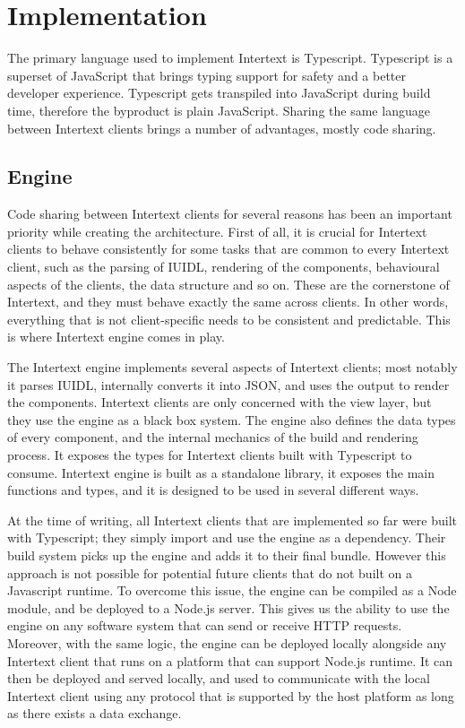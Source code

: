 
\chapter{Implementation} \label{implementation}

The primary language used to implement Intertext is Typescript. Typescript is a superset of JavaScript that brings typing support for safety and a better developer experience. Typescript gets transpiled into JavaScript during build time, therefore the byproduct is plain JavaScript. Sharing the same language between Intertext clients brings a number of advantages, mostly code sharing.

\section{Engine}

Code sharing between Intertext clients for several reasons has been an important priority while creating the architecture. First of all, it is crucial for Intertext clients to behave consistently for some tasks that are common to every Intertext client, such as the parsing of IUIDL, rendering of the components, behavioural aspects of the clients, the data structure and so on. These are the cornerstone of Intertext, and they must behave exactly the same across clients. In other words, everything that is not client-specific needs to be consistent and predictable. This is where Intertext engine comes in play.

The Intertext engine implements several aspects of Intertext clients; most notably it parses IUIDL, internally converts it into JSON, and uses the output to render the components. Intertext clients are only concerned with the view layer, but they use the engine as a black box system. The engine also defines the data types of every component, and the internal mechanics of the build and rendering process. It exposes the types for Intertext clients built with Typescript to consume. Intertext engine is built as a standalone library, it exposes the main functions and types, and it is designed to be used in several different ways.

At the time of writing, all Intertext clients that are implemented so far were built with Typescript; they simply import and use the engine as a dependency. Their build system picks up the engine and adds it to their final bundle. However this approach is not possible for potential future clients that do not built on a Javascript runtime. To overcome this issue, the engine can be compiled as a Node module, and be deployed to a Node.js server. This gives us the ability to use the engine on any software system that can send or receive HTTP requests. Moreover, with the same logic, the engine can be deployed locally alongside any Intertext client that runs on a platform that can support Node.js runtime. It can then be deployed and served locally, and used to communicate with the local Intertext client using any protocol that is supported by the host platform as long as there exists a data exchange. 

